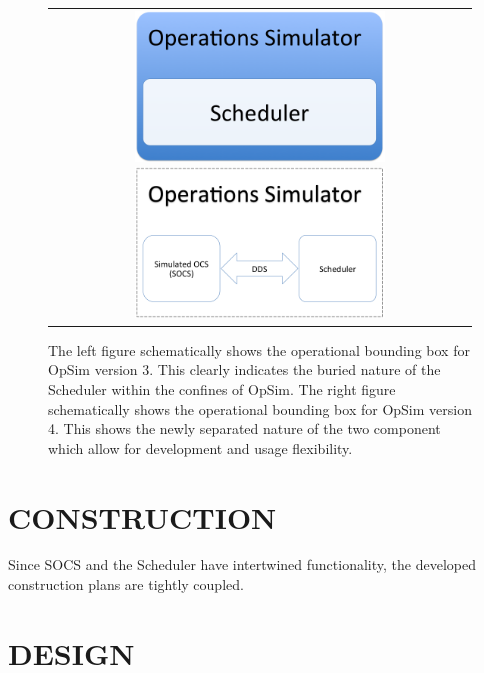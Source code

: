 \documentclass[]{spie}  %
\begin{document}
\begin{figure} [ht]
  	\begin{center}
  		\begin{tabular}{c} 
  			\includegraphics[height=4cm]{Opsimv3.png}
  			\includegraphics[height=4cm]{Opsimv4.png}
  		\end{tabular}
  	\end{center}
  	\caption[What is this?] 
  	{ \label{fig:opsim} 
  		The left figure schematically shows the operational bounding box for OpSim version 3. This clearly indicates the buried nature of the Scheduler within the confines of OpSim. The right figure schematically shows the operational bounding box for OpSim version 4. This shows the newly separated nature of the two component which allow for development and usage flexibility.}
\end{figure} 

\section{CONSTRUCTION}
\label{sec:construction}

Since SOCS and the Scheduler have intertwined functionality, the developed construction plans are tightly coupled. 

\section{DESIGN}
\end{document}
